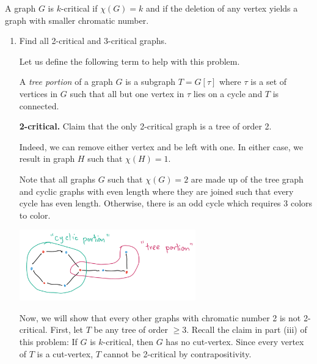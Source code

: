 \setcounter{question}{3}
\question A graph \(G\) is \(k\)-critical if \(\chi(G)=k\) and if
  the deletion of any vertex yields a graph with smaller chromatic
  number.
  \begin{enumerate}[label=(\roman*)]
    \item Find all 2-critical and 3-critical graphs.
      \begin{solution} 
        Let us define the following term to help with this
        problem.

        \begin{definition}
          A \textit{tree portion} of a graph \(G\) is a
          subgraph \(T = G[\tau]\) where \(\tau\) is a set of
          vertices in \(G\) such that all but one vertex in
          \(\tau\) lies on a cycle and \(T\) is connected.
        \end{definition}
        
        \textbf{2-critical.} Claim that the only 2-critical graph
        is a tree of order 2.

        Indeed, we can remove either vertex and be left with
        one. In either case, we result in graph \(H\) such that
        \(\chi(H) = 1\).

        Note that all graphs \(G\) such that
        \(\chi(G) = 2\) are made up of the tree graph and cyclic
        graphs with even length where they are joined such that
        every cycle has even length. Otherwise, there is an odd
        cycle which requires 3 colors to color.

        \begin{center}
          \includegraphics[width=0.6\textwidth]{figures/2-colorable}
        \end{center}

        Now, we will show that every other graphs with chromatic
        number 2 is not 2-critical. First, let \(T\) be any tree
        of order \(\geq3\). Recall the claim in part (iii) of this
        problem: If \(G\) is \(k\)-critical, then \(G\) has no
        cut-vertex. Since every vertex of \(T\) is a cut-vertex,
        \(T\) cannot be 2-critical by contrapositivity.


\end{solution}
\end{enumerate}
